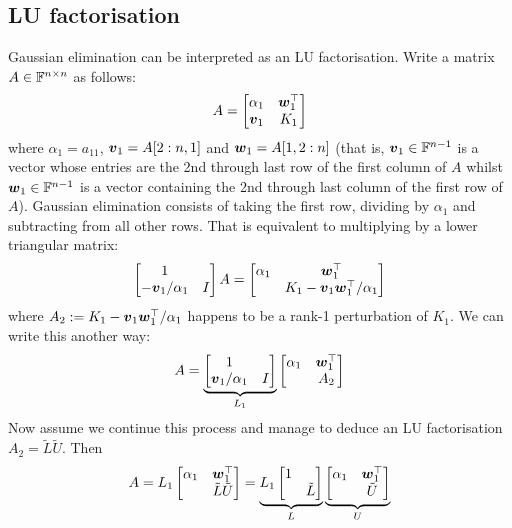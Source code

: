 \subsection{LU factorisation}
Gaussian elimination  can be interpreted as an LU factorisation. Write a matrix $A \in {\mathbb F}^{n \times n}$ as follows:
\[
A =  \begin{bmatrix} \alpha_1 & \bm{{\mbox{\boldmath$w$\unboldmath}}}_1^\top \\ \bm{{\mbox{\boldmath$v$\unboldmath}}}_1 & K_1 \end{bmatrix}
\]
where $\ensuremath{\alpha}_1 = a_{11}$, $\bm{{\mbox{\boldmath$v$\unboldmath}}}_1 = A[2:n, 1]$ and $\bm{{\mbox{\boldmath$w$\unboldmath}}}_1 = A[1, 2:n]$ (that is, $\bm{{\mbox{\boldmath$v$\unboldmath}}}_1 \in {\mathbb F}^{n-1}$ is a vector whose entries are the 2nd through last row of the first column of $A$ whilst $\bm{{\mbox{\boldmath$w$\unboldmath}}}_1 \in {\mathbb F}^{n-1}$ is a vector containing the 2nd through last column of the first row of $A$). Gaussian elimination consists of taking the first row, dividing by $\ensuremath{\alpha}_1$ and subtracting from all other rows. That is equivalent to multiplying by a lower triangular matrix:
\[
\begin{bmatrix}
1 \\
-\bm{{\mbox{\boldmath$v$\unboldmath}}}_1/\alpha_1 & I \end{bmatrix} A = \begin{bmatrix} \alpha_1 & \bm{{\mbox{\boldmath$w$\unboldmath}}}_1^\top \\  & K_1 -\bm{{\mbox{\boldmath$v$\unboldmath}}}_1\bm{{\mbox{\boldmath$w$\unboldmath}}}_1^\top /\alpha_1 \end{bmatrix}
\]
where $A_2 := K_1 -\bm{{\mbox{\boldmath$v$\unboldmath}}}_1\bm{{\mbox{\boldmath$w$\unboldmath}}}_1^\top /\alpha_1$  happens to be a rank-1 perturbation of $K_1$. We can write this another way:
\[
A = \underbrace{\begin{bmatrix}
1 \\
\bm{{\mbox{\boldmath$v$\unboldmath}}}_1/\alpha_1 & I \end{bmatrix}}_{L_1}  \begin{bmatrix} \alpha_1 & \bm{{\mbox{\boldmath$w$\unboldmath}}}_1^\top \\  & A_2 \end{bmatrix}
\]
Now assume we continue this process and manage to deduce an LU factorisation $A_2 = \tilde{L} \tilde{U}$. Then
\[
A = L_1 \begin{bmatrix} \alpha_1 & \bm{{\mbox{\boldmath$w$\unboldmath}}}_1^\top \\  & \tilde{L} \tilde{U} \end{bmatrix}
= \underbrace{L_1 \begin{bmatrix}
1 \\
 & \tilde{L} \end{bmatrix}}_L  \underbrace{\begin{bmatrix} \alpha_1 & \bm{{\mbox{\boldmath$w$\unboldmath}}}_1^\top \\  & \tilde{U} \end{bmatrix}}_U
\]
